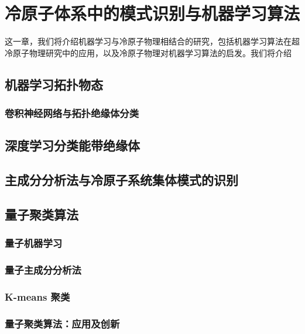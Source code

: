 \chapter{冷原子体系中的模式识别与机器学习算法}

这一章，我们将介绍机器学习与冷原子物理相结合的研究，包括机器学习算法在超冷原子物理研究中的应用，以及冷原子物理对机器学习算法的启发。我们将介绍




\section{机器学习拓扑物态}\label{sec:mltopo}

\subsection{卷积神经网络与拓扑绝缘体分类}\label{sec:cnn}


\section{深度学习分类能带绝缘体}\label{sec:dltopo}


\section{主成分分析法与冷原子系统集体模式的识别}\label{sec:pca}


\section{量子聚类算法}\label{sec:quantumcluster}

\subsection{量子机器学习}

\subsection{量子主成分分析法}

\subsection{K-means 聚类}\label{sec:kmeans}

\subsection{量子聚类算法：应用及创新}